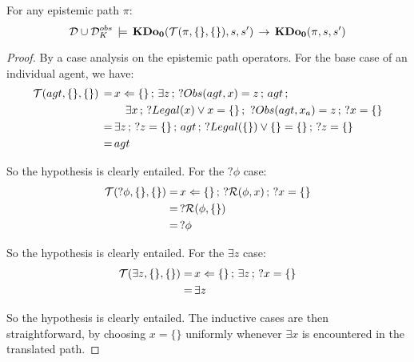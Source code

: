 \medskip{}


\begin{lemma}
\label{lem:KDoZ_E1_impl_KDoZ}For any epistemic path $\pi$:\[
\mathcal{D}\cup\mathcal{D}_{K}^{obs}\,\models\,\mathbf{KDo_{0}}(\mathcal{T}(\pi,\{\},\{\}),s,s')\,\rightarrow\,\mathbf{KDo_{0}}(\pi,s,s')\]

\end{lemma}
\begin{proof}
By a case analysis on the epistemic path operators. For the base case
of an individual agent, we have:\begin{align*}
\mathcal{T}(agt,\{\},\{\})\,=\, & x\Leftarrow\{\}\,;\,\exists z\,;\,?Obs(agt,x)=z\,;\, agt\,;\\
 & \,\,\,\,\,\,\exists x\,;\,?Legal(x)\vee x=\{\}\,;\,\,?Obs(agt,x_{a})=z\,;\,?x=\{\}\\
=\, & \exists z\,;\,?z=\{\}\,;\, agt\,;\,?Legal(\{\})\vee\{\}=\{\}\,;\,?z=\{\}\\
=\, & agt\end{align*}


So the hypothesis is clearly entailed. For the $?\phi$ case:\begin{align*}
\mathcal{T}(?\phi,\{\},\{\})=\, & x\Leftarrow\{\}\,;\,?\mathcal{R}(\phi,x)\,;\,?x=\{\}\\
=\, & ?\mathcal{R}(\phi,\{\})\\
=\, & ?\phi\end{align*}


So the hypothesis is clearly entailed. For the $\exists z$ case:\begin{align*}
\mathcal{T}(\exists z,\{\},\{\})=\, & x\Leftarrow\{\}\,;\,\exists z\,;\,?x=\{\}\\
=\, & \exists z\end{align*}


So the hypothesis is clearly entailed. The inductive cases are then
straightforward, by choosing $x=\{\}$ uniformly whenever $\exists x$
is encountered in the translated path. 
\end{proof}
\medskip{}


